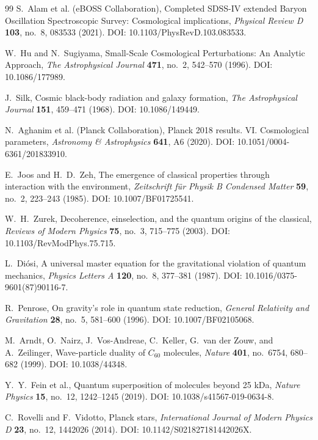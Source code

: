 \begin{thebibliography}{99}
S.~Alam et al. (eBOSS Collaboration), Completed SDSS-IV extended Baryon Oscillation Spectroscopic Survey: Cosmological implications, \textit{Physical Review D} \textbf{103}, no.~8, 083533 (2021). DOI: 10.1103/PhysRevD.103.083533.

W.~Hu and N.~Sugiyama, Small-Scale Cosmological Perturbations: An Analytic Approach, \textit{The Astrophysical Journal} \textbf{471}, no.~2, 542--570 (1996). DOI: 10.1086/177989.

J.~Silk, Cosmic black-body radiation and galaxy formation, \textit{The Astrophysical Journal} \textbf{151}, 459--471 (1968). DOI: 10.1086/149449.

N.~Aghanim et al. (Planck Collaboration), Planck 2018 results. VI. Cosmological parameters, \textit{Astronomy \& Astrophysics} \textbf{641}, A6 (2020). DOI: 10.1051/0004-6361/201833910.

E.~Joos and H.~D.~Zeh, The emergence of classical properties through interaction with the environment, \textit{Zeitschrift f\"ur Physik B Condensed Matter} \textbf{59}, no.~2, 223--243 (1985). DOI: 10.1007/BF01725541.

W.~H.~Zurek, Decoherence, einselection, and the quantum origins of the classical, \textit{Reviews of Modern Physics} \textbf{75}, no.~3, 715--775 (2003). DOI: 10.1103/RevModPhys.75.715.

L.~Di\'osi, A universal master equation for the gravitational violation of quantum mechanics, \textit{Physics Letters A} \textbf{120}, no.~8, 377--381 (1987). DOI: 10.1016/0375-9601(87)90116-7.

R.~Penrose, On gravity's role in quantum state reduction, \textit{General Relativity and Gravitation} \textbf{28}, no.~5, 581--600 (1996). DOI: 10.1007/BF02105068.

M.~Arndt, O.~Nairz, J.~Vos-Andreae, C.~Keller, G.~van der Zouw, and A.~Zeilinger, Wave-particle duality of $C_{60}$ molecules, \textit{Nature} \textbf{401}, no.~6754, 680--682 (1999). DOI: 10.1038/44348.

Y.~Y.~Fein et al., Quantum superposition of molecules beyond 25 kDa, \textit{Nature Physics} \textbf{15}, no.~12, 1242--1245 (2019). DOI: 10.1038/s41567-019-0634-8.

C.~Rovelli and F.~Vidotto, Planck stars, \textit{International Journal of Modern Physics D} \textbf{23}, no.~12, 1442026 (2014). DOI: 10.1142/S021827181442026X.


\end{thebibliography}
